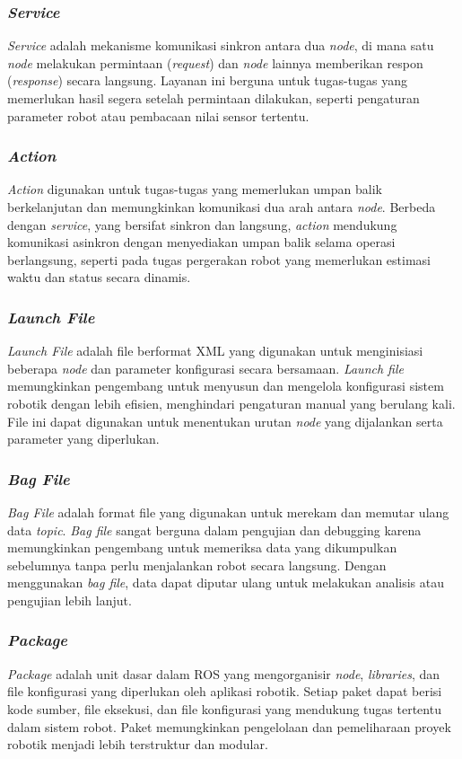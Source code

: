 \subsubsection{\emph{Service}}
\emph{Service} adalah mekanisme komunikasi sinkron antara dua \emph{node}, di mana satu \emph{node} melakukan permintaan (\emph{request}) dan \emph{node} lainnya memberikan respon (\emph{response}) secara langsung. Layanan ini berguna untuk tugas-tugas yang memerlukan hasil segera setelah permintaan dilakukan, seperti pengaturan parameter robot atau pembacaan nilai sensor tertentu.

\subsubsection{\emph{Action}}
\emph{Action} digunakan untuk tugas-tugas yang memerlukan umpan balik berkelanjutan dan memungkinkan komunikasi dua arah antara \emph{node}. Berbeda dengan \emph{service}, yang bersifat sinkron dan langsung, \emph{action} mendukung komunikasi asinkron dengan menyediakan umpan balik selama operasi berlangsung, seperti pada tugas pergerakan robot yang memerlukan estimasi waktu dan status secara dinamis.

\subsubsection{\emph{Launch File}}
\emph{Launch File} adalah file berformat XML yang digunakan untuk menginisiasi beberapa \emph{node} dan parameter konfigurasi secara bersamaan. \emph{Launch file} memungkinkan pengembang untuk menyusun dan mengelola konfigurasi sistem robotik dengan lebih efisien, menghindari pengaturan manual yang berulang kali. File ini dapat digunakan untuk menentukan urutan \emph{node} yang dijalankan serta parameter yang diperlukan.

\subsubsection{\emph{Bag File}}
\emph{Bag File} adalah format file yang digunakan untuk merekam dan memutar ulang data \emph{topic}. \emph{Bag file} sangat berguna dalam pengujian dan debugging karena memungkinkan pengembang untuk memeriksa data yang dikumpulkan sebelumnya tanpa perlu menjalankan robot secara langsung. Dengan menggunakan \emph{bag file}, data dapat diputar ulang untuk melakukan analisis atau pengujian lebih lanjut.

\subsubsection{\emph{Package}}
\emph{Package} adalah unit dasar dalam ROS yang mengorganisir \emph{node}, \emph{libraries}, dan file konfigurasi yang diperlukan oleh aplikasi robotik. Setiap paket dapat berisi kode sumber, file eksekusi, dan file konfigurasi yang mendukung tugas tertentu dalam sistem robot. Paket memungkinkan pengelolaan dan pemeliharaan proyek robotik menjadi lebih terstruktur dan modular.

